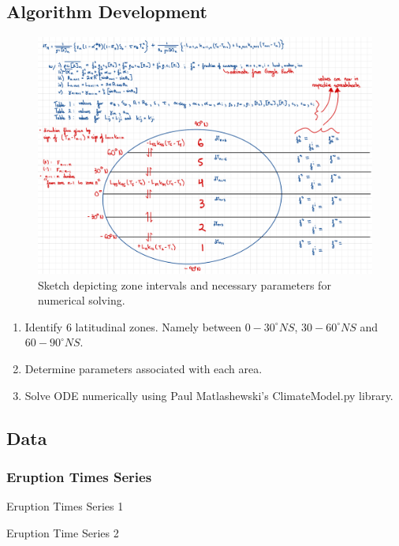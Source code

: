 \documentclass[12pt]{article}
\begin{document}
\subsection{Algorithm Development}

\begin{figure}[H]
    \centering
    \includegraphics[scale=0.3]{Graphicalg.pdf}
    \caption{
        Sketch depicting zone intervals and necessary parameters for numerical
        solving.
    }
    \label{fig:graphicalg}
\end{figure}
\FloatBarrier

\begin{enumerate}
    \item Identify 6 latitudinal zones. Namely between $0-30^{\circ}NS$,
    $30-60^{\circ}NS$ and $60-90^{\circ}NS$.
    \item Determine parameters associated with each area.
    \item Solve ODE numerically using Paul Matlashewski's
    ClimateModel.py library.  
\end{enumerate}

\subsection{Data}
\subsubsection{Eruption Times Series}
\begin{table}[H]
    \parbox{.45\linewidth}{
    \captionsetup{singlelinecheck = false, justification=justified}
    \caption{Eruption Times Series 1}
    \label{tab:erupt1}
    }
    \hfill
    \parbox{.45\linewidth}{
    \captionsetup{singlelinecheck = false, justification=justified}
    \caption{Eruption Time Series 2}
    \label{tab:erupt2}
    }
\end{table}
\end{document}
